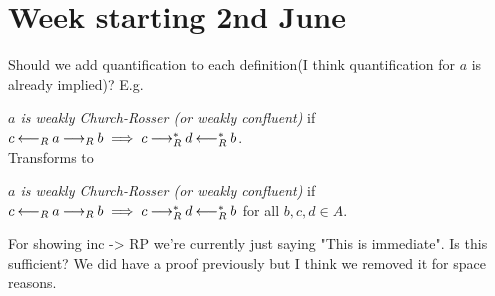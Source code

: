 \documentclass{article}
\begin{document}
\section*{Week starting 2nd June}
\begin{todolist}
  \item Should we add quantification to each definition(I think quantification for $a$ is already implied)? E.g.\\ 
  \item [\ule{$a \in \WCR_R$}] \emph{$a$ is weakly Church-Rosser (or weakly confluent)} if $c \mathbin{\longleftarrow_R} a \mathbin{\longrightarrow_R} b \implies c \mathbin{\longrightarrow_R^*} d \mathbin{\longleftarrow_R^*} b$.\\
   Transforms to 
  \item[\ule{$a \in \WCR_R$}] \emph{$a$ is weakly Church-Rosser (or weakly confluent)} if $c \mathbin{\longleftarrow_R} a \mathbin{\longrightarrow_R} b \implies c \mathbin{\longrightarrow_R^*} d \mathbin{\longleftarrow_R^*} b$ for all $b, c, d \in A$. 
  \item For showing inc -> RP we're currently just saying "This is immediate". Is this sufficient? We did have a proof previously but I think we removed it for space reasons. 
\end{todolist}
\end{document}
